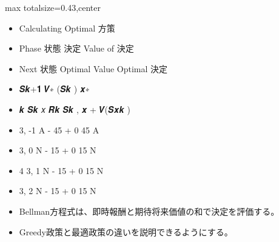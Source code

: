 \clearpage
{}
\begin{minipage}[t]{0.405\textwidth}
\begin{adjustbox}{max totalsize={\textwidth}{0.43\textheight},center}
\begin{minipage}{\textwidth}\scriptsize
{}\begin{itemize}
\item Calculating Optimal 方策
\item Phase 状態 決定 Value of 決定
\item Next 状態 Optimal Value Optimal 決定
\item 𝑺𝒌+𝟏 𝑽∗ (𝑺𝒌 ) 𝒙∗
\item 𝒌 𝑺𝒌 𝑥 𝑹𝒌 𝑺𝒌 , 𝒙 + 𝑽(𝑺𝒙𝒌 )
\item 3, -1 A - 45 + 0 45 A
\item 3, 0 N - 15 + 0 15 N
\item 4 3, 1 N - 15 + 0 15 N
\item 3, 2 N - 15 + 0 15 N
\end{itemize}\begin{itemize}
\item Bellman方程式は、即時報酬と期待将来価値の和で決定を評価する。
\item Greedy政策と最適政策の違いを説明できるようにする。
\end{itemize}
\end{minipage}
\end{adjustbox}
\end{minipage}\hfill

